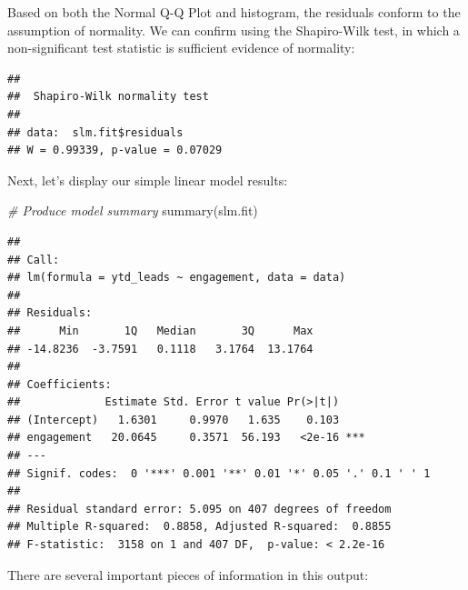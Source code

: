\documentclass[
]{book}
\newenvironment{Shaded}{\begin{snugshade}}{\end{snugshade}}
\newcommand{\CommentTok}[1]{\textcolor[rgb]{0.56,0.35,0.01}{\textit{#1}}}
\newcommand{\FunctionTok}[1]{\textcolor[rgb]{0.00,0.00,0.00}{#1}}
\newcommand{\NormalTok}[1]{#1}
\newcommand{\SpecialCharTok}[1]{\textcolor[rgb]{0.00,0.00,0.00}{#1}}
\begin{document}
Based on both the Normal Q-Q Plot and histogram, the residuals conform to the assumption of normality. We can confirm using the Shapiro-Wilk test, in which a non-significant test statistic is sufficient evidence of normality:

\begin{Shaded}
\end{Shaded}

\begin{verbatim}
## 
##  Shapiro-Wilk normality test
## 
## data:  slm.fit$residuals
## W = 0.99339, p-value = 0.07029
\end{verbatim}

Next, let's display our simple linear model results:

\begin{Shaded}
\begin{Highlighting}[]
\CommentTok{\# Produce model summary}
\FunctionTok{summary}\NormalTok{(slm.fit)}
\end{Highlighting}
\end{Shaded}

\begin{verbatim}
## 
## Call:
## lm(formula = ytd_leads ~ engagement, data = data)
## 
## Residuals:
##      Min       1Q   Median       3Q      Max 
## -14.8236  -3.7591   0.1118   3.1764  13.1764 
## 
## Coefficients:
##             Estimate Std. Error t value Pr(>|t|)    
## (Intercept)   1.6301     0.9970   1.635    0.103    
## engagement   20.0645     0.3571  56.193   <2e-16 ***
## ---
## Signif. codes:  0 '***' 0.001 '**' 0.01 '*' 0.05 '.' 0.1 ' ' 1
## 
## Residual standard error: 5.095 on 407 degrees of freedom
## Multiple R-squared:  0.8858, Adjusted R-squared:  0.8855 
## F-statistic:  3158 on 1 and 407 DF,  p-value: < 2.2e-16
\end{verbatim}

There are several important pieces of information in this output:
\end{document}
